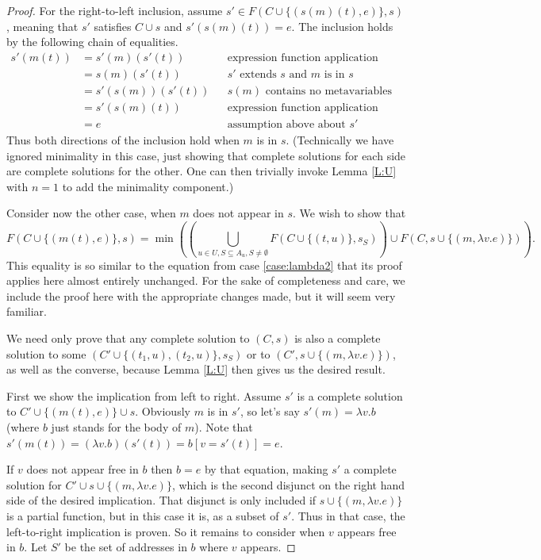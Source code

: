 \documentclass{article}
\begin{document}
\begin{proof}
For the right-to-left inclusion, assume $s'\in F(C\cup\{(s(m)(t),e)\},s)$, meaning that $s'$ satisfies $C\cup s$ and $s'(s(m)(t))=e$.  The inclusion holds by the following chain of equalities.
	\begin{align*}
		s'(m(t))	&=	s'(m)(s'(t))		&&	\text{expression function application structure}	\\
					&=	s(m)(s'(t))			&&	\text{$s'$ extends $s$ and $m$ is in $s$}							\\
					&=	s'(s(m))(s'(t))		&&	\text{$s(m)$ contains no metavariables}		\\
					&=	s'(s(m)(t))			&&	\text{expression function application structure}		\\
					&=	e					&&	\text{assumption above about $s'$}
	\end{align*}
Thus both directions of the inclusion hold when $m$ is in $s$.  (Technically we have ignored minimality in this case, just showing that complete solutions for each side are complete solutions for the other.  One can then trivially invoke Lemma \ref{L:U} with $n=1$ to add the minimality component.)

Consider now the other case, when $m$ does not appear in $s$.  We wish to show that
	$$	F(C\cup\{(m(t),e)\},s) = 
			\min\left(\left(\bigcup_{u\in U,S\subseteq A_u,S\neq\emptyset}
				F(C\cup\{(t,u)\},s_S)\right)
					\cup F(C,s\cup\{(m,\lambda v.e)\})\right).	$$
This equality is so similar to the equation from case \ref{case:lambda2} that its proof applies here almost entirely unchanged.  For the sake of completeness and care, we include the proof here with the appropriate changes made, but it will seem very familiar.

We need only prove that any complete solution to $(C,s)$ is also a complete solution to some $(C'\cup\{(t_1,u),(t_2,u)\},s_S)$ or to $(C',s\cup\{(m,\lambda v.e)\})$, as well as the converse, because Lemma \ref{L:U} then gives us the desired result.

First we show the implication from left to right.  Assume $s'$ is a complete solution to $C'\cup\{(m(t),e)\}\cup s$.  Obviously $m$ is in $s'$, so let's say $s'(m)=\lambda v.b$ (where $b$ just stands for the body of $m$).  Note that $s'(m(t))=(\lambda v.b)(s'(t))=b[v=s'(t)]=e$.

If $v$ does not appear free in $b$ then $b=e$ by that equation, making $s'$ a complete solution for $C'\cup s\cup\{(m,\lambda v.e)\}$, which is the second disjunct on the right hand side of the desired implication.  That disjunct is only included if $s\cup\{(m,\lambda v.e)\}$ is a partial function, but in this case it is, as a subset of $s'$.  Thus in that case, the left-to-right implication is proven.  So it remains to consider when $v$ appears free in $b$.  Let $S'$ be the set of addresses in $b$ where $v$ appears.


\end{proof}
\end{document}
